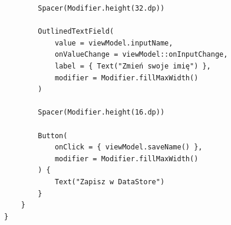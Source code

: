 \begin{verbatim}
        Spacer(Modifier.height(32.dp))

        OutlinedTextField(
            value = viewModel.inputName,
            onValueChange = viewModel::onInputChange,
            label = { Text("Zmień swoje imię") },
            modifier = Modifier.fillMaxWidth()
        )
        
        Spacer(Modifier.height(16.dp))
        
        Button(
            onClick = { viewModel.saveName() },
            modifier = Modifier.fillMaxWidth()
        ) {
            Text("Zapisz w DataStore")
        }
    }
}
\end{verbatim}